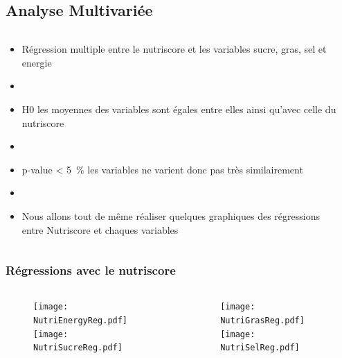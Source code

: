 \subsection{Analyse Multivariée}
\begin{frame}{\insertsubsection}
  \begin{columns}
    \begin{column}{.5\textwidth}
      \begin{itemize}
        \item Régression multiple entre le nutriscore et les variables
              sucre, gras, sel et energie
        \item[]
        \item H0 les moyennes des variables sont égales entre elles
              ainsi qu'avec celle du nutriscore
        \item[]
        \item p-value \qty{< 5}{\percent} les variables ne varient donc pas très similairement
        \item[]
        \item Nous allons tout de même réaliser quelques graphiques des régressions
              entre Nutriscore et chaques variables
      \end{itemize}
    \end{column}
    \begin{column}{.5\textwidth}
      \begin{table}
        \tiny
        
      \end{table}
    \end{column}
  \end{columns}
\end{frame}

\subsubsection{Régressions avec le nutriscore}
\begin{frame}{\insertsubsubsection}
  \begin{columns}
    \begin{column}{.5\textwidth}
      \begin{figure}
        \texttt{[image: NutriEnergyReg.pdf]}
        \texttt{[image: NutriSucreReg.pdf]}
      \end{figure}
    \end{column}
    \begin{column}{.5\textwidth}
      \begin{figure}
        \texttt{[image: NutriGrasReg.pdf]}
        \texttt{[image: NutriSelReg.pdf]}
      \end{figure}
    \end{column}
  \end{columns}
\end{frame}


